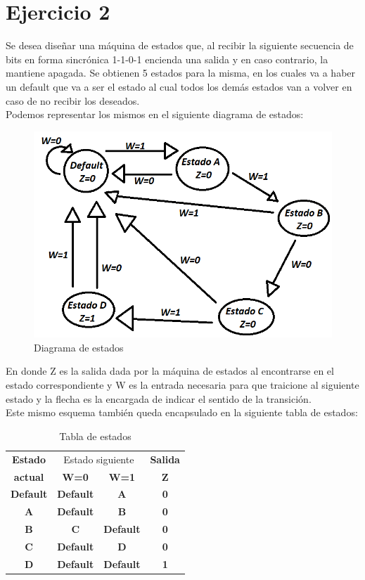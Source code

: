 \chapter{Ejercicio 2}
Se desea diseñar una máquina de estados que, al recibir la siguiente secuencia de bits en forma sincrónica 1-1-0-1 encienda una salida y en caso contrario, la mantiene apagada. Se obtienen 5 estados para la misma, en los cuales va a haber un default que va a ser el estado al cual todos los demás estados van a volver en caso de no recibir los deseados.\\
Podemos representar los mismos en el siguiente diagrama de estados:\\
\begin{figure}[h!]
	\centering
	\includegraphics[scale=0.4]{../Ejercicio-2/Diagrama_de_estados.png}
	\caption{Diagrama de estados}
\end{figure}
En donde Z es la salida dada por la máquina de estados al encontrarse en el estado correspondiente y W es la entrada necesaria para que traicione al siguiente estado y la flecha es la encargada de indicar el sentido de la transición.\\
Este mismo esquema también queda encapsulado en la siguiente tabla de estados:\\
\FloatBarrier
\begin{table}[h!]
	\begin{center}
		\caption{Tabla de estados}
			\begin{tabular}{|c|c c|c|}
			\hline
			\textbf{Estado} &\multicolumn{2}{|c|}{Estado siguiente} & \textbf{Salida}\\
			\textbf{actual} & \textbf{ W=0 } & \textbf{ W=1 } & \textbf{Z}\\
			\hline
			\textbf{Default} & \textbf{ Default } & \textbf{ A } & \textbf{0}\\
			\hline
			\textbf{A} & \textbf{ Default } & \textbf{ B } & \textbf{0}\\
			\hline
			\textbf{B} & \textbf{ C } & \textbf{Default } & \textbf{0}\\
			\hline
			\textbf{C} & \textbf{ Default } & \textbf{ D } & \textbf{0}\\
			\hline
			\textbf{D} & \textbf{Default } & \textbf{Default} & \textbf{1}\\
			\hline
			\end{tabular}
	\end{center}
\end{table}
\FloatBarrier